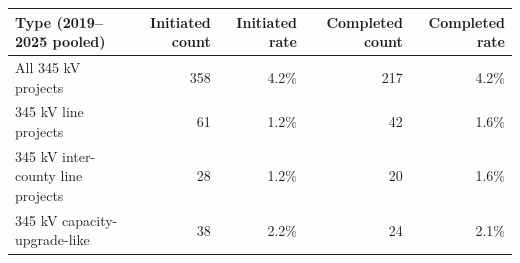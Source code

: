\begin{table}[!htbp]
\centering
\small
\setlength{\tabcolsep}{8pt}
\renewcommand{\arraystretch}{1.15}
\begin{tabular}{@{}lrrrr@{}}
\toprule
Type (2019--2025 pooled) & Initiated count & Initiated rate & Completed count & Completed rate \\
\midrule
All 345 kV projects & 358 & 4.2\% & 217 & 4.2\% \\
345 kV line projects & 61 & 1.2\% & 42 & 1.6\% \\
345 kV inter-county line projects & 28 & 1.2\% & 20 & 1.6\% \\
345 kV capacity-upgrade-like & 38 & 2.2\% & 24 & 2.1\% \\
\bottomrule
\end{tabular}
\end{table}
